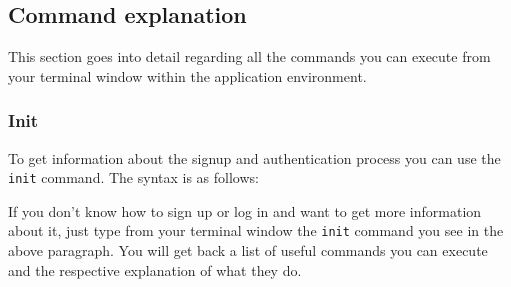 \subsection{Command explanation}\label{commands}
This section goes into detail regarding all the commands you can execute from your terminal window within the application environment.

\subsubsection{Init}
To get information about the signup and authentication process you can use the \texttt{init} command. The syntax is as follows:
\begin{center}
\end{center}
If you don't know how to sign up or log in and want to get more information about it, just type from your terminal window the \texttt{init} command you see in the above paragraph.
You will get back a list of useful commands you can execute and the respective explanation of what they do.

